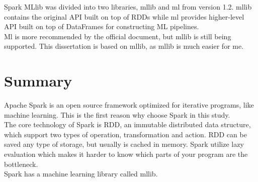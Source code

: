 Spark MLlib was divided into two libraries, mllib and ml from version 1.2. mllib contains the original API built on top of RDDs while ml provides higher-level API built on top of DataFrames for constructing ML pipelines.\\



Ml is more recommended by the official document, but mllib is still being supported. This dissertation is based on mllib, as mllib is much easier for me.


\section{Summary}
Apache Spark is an open source framework optimized for iterative programs, like machine learning. This is the first reason why choose Spark in this study.\\


The core technology of Spark is RDD, an immutable distributed data structure, which support two types of operation, transformation and action. RDD can be saved any type of storage, but usually is cached in memory. Spark utilize lazy evaluation which makes it harder to know which parts of your program are the bottleneck.\\


Spark has a machine learning library called mllib.


